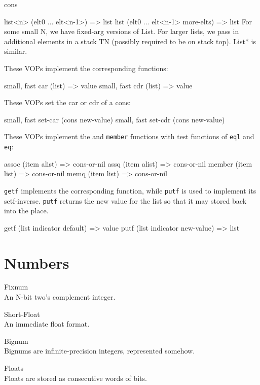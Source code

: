 {cons

\begin{example}
list<n> (elt0 ... elt<n-1>) => list
list (elt0 ... elt<n-1> more-elts) => list
    For some small N, we have fixed-arg versions of List.  For larger lists, we
    pass in additional elements in a stack TN (possibly required to be on stack
    top).  List* is similar.
\end{example}

These VOPs implement the corresponding \clisp functions:
\begin{example}
{small, fast} car (list) => value 
{small, fast} cdr (list) => value 
\end{example}

These VOPs set the car or cdr of a cons:
\begin{example}
{small, fast} set-car (cons new-value)
{small, fast} set-cdr (cons new-value)
\end{example}

These VOPs implement the  and {\tt member} functions with test
functions of {\tt eql} and {\tt eq}:
\begin{example}
assoc (item alist) => cons-or-nil
assq (item alist) => cons-or-nil
member (item list) => cons-or-nil
memq (item list) => cons-or-nil
\end{example}


{\tt getf} implements the corresponding \clisp function, while {\tt putf} is used
to implement its setf-inverse.  {\tt putf} returns the new value for the list so
that it may stored back into the place.
\begin{example}
getf (list indicator default) => value
putf (list indicator new-value) => list
\end{example}

\chapter{Numbers}

Fixnum\\An N-bit two's complement integer.

Short-Float\\An immediate float format.

\label{Bignums}
Bignum\\Bignums are infinite-precision integers, represented somehow.

Floats\\Floats are stored as consecutive words of bits.

}
